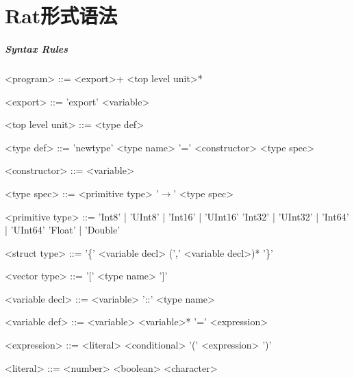 \chapter{Rat形式语法}\label{chap:formal-syntax}

\setlength{\grammarindent}{10em}
\setlength{\grammarparsep}{5pt}
\paragraph{Syntax Rules}
\begin{grammar}
<program>        ::=    <export>+ <top level unit>*

<export>         ::=    'export' <variable>

<top level unit> ::=    <type def>

<type def>       ::=    'newtype' <type name> '=' <constructor> <type spec>

<constructor>    ::=    <variable>

<type spec>      ::=    <primitive type>
                  '$\to$' <type spec>

<primitive type> ::=    'Int8' | 'UInt8' | 'Int16' | 'UInt16' \alt 'Int32' | 'UInt32' | 'Int64' | 'UInt64'
                 \alt     'Float' | 'Double'

<struct type>    ::=    '\{' <variable decl> (',' <variable decl>)* '\}'

<vector type>    ::=    '[' <type name> ']'

<variable decl>  ::=    <variable> '::' <type name>

<variable def>   ::=    <variable> <variable>* '=' <expression>

<expression>     ::=    <literal>
                 \alt     <conditional>
                 \alt     '(' <expression> ')'

<literal>        ::=    <number>
                 \alt     <boolean>
                 \alt     <character>


\end{grammar}
